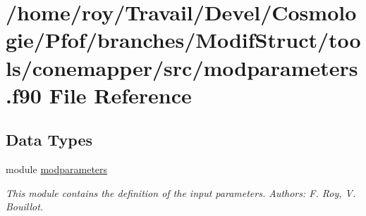 \hypertarget{tools_2conemapper_2src_2modparameters_8f90}{\section{/home/roy/\-Travail/\-Devel/\-Cosmologie/\-Pfof/branches/\-Modif\-Struct/tools/conemapper/src/modparameters.f90 File Reference}
\label{tools_2conemapper_2src_2modparameters_8f90}
}
\subsection*{Data Types}
\begin{DoxyCompactItemize}
\item 
module \hyperlink{classmodparameters}{modparameters}
\begin{DoxyCompactList}\small\item\em This module contains the definition of the input parameters. Authors\-: F. Roy, V. Bouillot. \end{DoxyCompactList}\end{DoxyCompactItemize}
